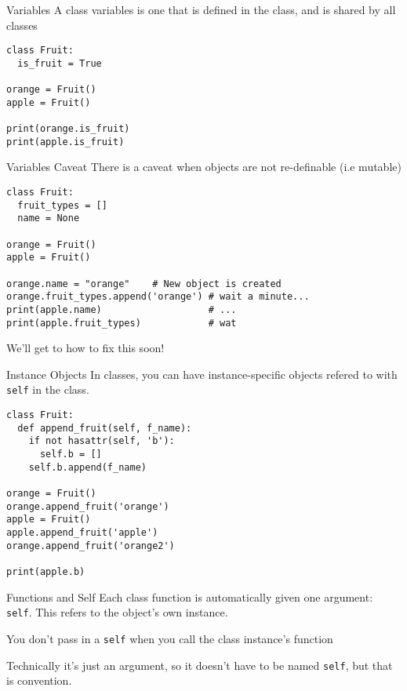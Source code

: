 \begin{frame}[containsverbatim]{Variables}
  A class variables is one that is defined in the class, and is shared by all classes
\begin{verbatim}
class Fruit:
  is_fruit = True

orange = Fruit()
apple = Fruit()

print(orange.is_fruit)
print(apple.is_fruit)
\end{verbatim}
\end{frame}

\begin{frame}[containsverbatim]{Variables Caveat}
  There is a caveat when objects are not re-definable (i.e mutable)
\begin{verbatim}
class Fruit:
  fruit_types = []
  name = None

orange = Fruit()
apple = Fruit()

orange.name = "orange"    # New object is created
orange.fruit_types.append('orange') # wait a minute...
print(apple.name)                   # ...
print(apple.fruit_types)            # wat
\end{verbatim}
We'll get to how to fix this soon!
\end{frame}

\begin{frame}[containsverbatim]{Instance Objects}
  In classes, you can have instance-specific objects refered to with \verb|self| in the class.
\begin{verbatim}
class Fruit:
  def append_fruit(self, f_name):
    if not hasattr(self, 'b'):
      self.b = []
    self.b.append(f_name)

orange = Fruit()
orange.append_fruit('orange')
apple = Fruit()
apple.append_fruit('apple')
orange.append_fruit('orange2')

print(apple.b)
\end{verbatim}
\end{frame}

\begin{frame}[containsverbatim]{Functions and Self}
  Each class function is automatically given one argument: \verb|self|. This refers to the object's own instance.

  You don't pass in a \verb|self| when you call the class instance's function

  Technically it's just an argument, so it doesn't have to be named \verb|self|, but that is convention.
\end{frame}



